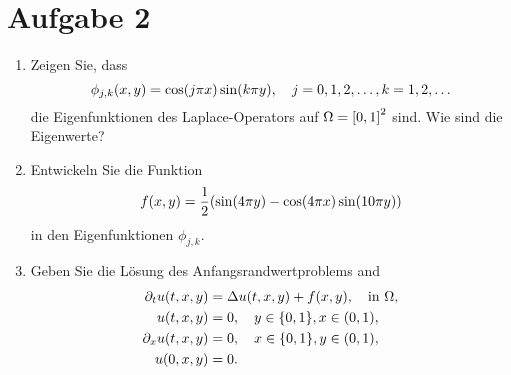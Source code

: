 \documentclass{exercise}
\begin{document}
    \section*{Aufgabe 2}
    
    \begin{problem}
        \begin{enumerate}
            \item Zeigen Sie, dass
            \[
                \phi_{j, k}\parentheses*{x, y} = \cos\parentheses*{j\pi x}\sin\parentheses*{k\pi y}, \quad j = 0, 1, 2, \ldots, k = 1, 2, \ldots
            \]
            die Eigenfunktionen des Laplace-Operators auf \(\Omega = \brackets*{0, 1}^2\) sind.
            Wie sind die Eigenwerte?
            \item Entwickeln Sie die Funktion
            \[
                f\parentheses*{x, y} = \frac{1}{2}\parentheses*{\sin\parentheses*{4\pi y} - \cos\parentheses*{4\pi x}\sin\parentheses*{10\pi y}}
            \]
            in den Eigenfunktionen \(\phi_{j, k}\).
            \item Geben Sie die Lösung des Anfangsrandwertproblems and
            \begin{align*}
                \partial_t u\parentheses*{t, x, y} &= \Delta u\parentheses*{t, x, y} + f\parentheses*{x, y}, \quad \text{in }\Omega,\\
                u\parentheses*{t, x, y} &= 0, \quad y \in \braces*{0, 1}, x \in \parentheses*{0, 1},\\
                \partial_x u\parentheses*{t, x, y} &= 0, \quad x \in \braces*{0, 1}, y \in \parentheses*{0, 1},\\
                u\parentheses*{0, x, y} &= 0.
            \end{align*}
        \end{enumerate}
    \end{problem}
    
\end{document}
